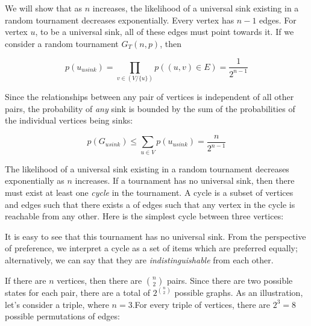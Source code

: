 We will show that as $n$ increases, the likelihood of a universal sink existing in a random tournament decreases exponentially.
Every vertex has $n-1$ edges.
For vertex $u$, to be a universal sink, all of these edges must point towards it.
If we consider a random tournament $G_T(n,p)$, then

\[
p(u_{usink}) = \prod_{v \in (V / \{u\})}p((u,v) \in E) = \frac{1}{2^{n-1}}
\]

Since the relationships between any pair of vertices is independent of all other pairs, the probability of \textit{any} sink is bounded by the sum of the probabilities of the individual vertices being sinks:

\[
p(G_{usink}) \leq \sum_{u \in V}p(u_{usink}) = \frac{n}{2^{n-1}}
\]

The likelihood of a universal sink existing in a random tournament decreases exponentially as $n$ increases.
If a tournament has no universal sink, then there must exist at least one \textit{cycle} in the tournament.
A cycle is a subset of vertices and edges such that there exists a  of edges such that any vertex in the cycle is reachable from any other.
Here is the simplest cycle between three vertices:

\begin{center}
\end{center}

It is easy to see that this tournament has no universal sink.
From the perspective of preference, we interpret a cycle as a set of items which are preferred equally; alternatively, we can say that they are \textit{indistinguishable} from each other.

If there are $n$ vertices, then there are $n\choose{2}$ pairs.
Since there are two possible states for each pair, there are a total of $2^{n\choose{2}}$ possible graphs.
As an illustration, let's consider a triple, where $n = 3$.For every triple of vertices, there are $2^3 = 8$ possible permutations of edges:

